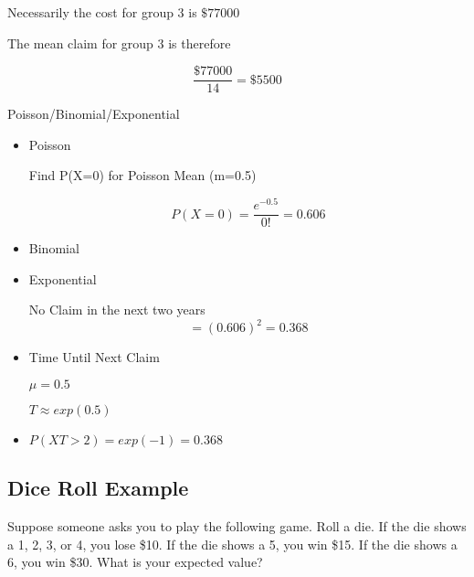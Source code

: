 \documentclass[]{report}
\begin{document}
Necessarily the cost for group 3 is $\$77000$

The mean claim for group 3 is therefore

\[ \frac{\$77000}{14} = \$5500 \]


Poisson/Binomial/Exponential

\begin{itemize}
	\item  Poisson
	
	Find P(X=0) for Poisson Mean (m=0.5)
	
	
	\[ P(X=0) = \frac{e^{-0.5}}{0!}  = 0.606 \]
	
	
	\item Binomial
	
	
	
	
	\item Exponential
	
	No Claim in the next two years
	\[	= (0.606)^2 = 0.368\]
	
	
	\item 	Time Until Next Claim
	
	$\mu= 0.5$
	
	$T \approx exp(0.5)$
	
	\item	$P(XT >2) = exp(-1) = 0.368$
	
\end{itemize}









\subsection{Dice Roll Example}

Suppose someone asks you to play the following game. Roll a die. If the die shows a 1, 2, 3, or 4, 
you lose \$10. If the die shows a 5, you win \$15. If the die shows a 6, you win \$30. What is your expected 
value?

\end{document}
